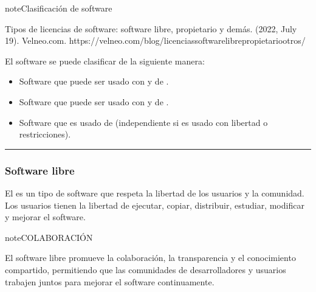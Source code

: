 \documentclass[letterpaper,10pt,spanish]{sphinxmanual}
\begin{document}
\begin{sphinxadmonition}{note}{Clasificación de software}

\sphinxAtStartPar
%
\begin{footnote}[2]\sphinxAtStartFootnote
Tipos de licencias de software: software libre, propietario y demás. (2022, July 19). Velneo.com. https://velneo.com/blog/licencias\sphinxhyphen{}software\sphinxhyphen{}libre\sphinxhyphen{}propietario\sphinxhyphen{}otros/
%
\end{footnote} El software se puede clasificar de la siguiente manera:
\begin{itemize}
\item {} 
\sphinxAtStartPar
{} Software que puede ser usado con  y de .

\item {} 
\sphinxAtStartPar
{} Software que puede ser usado con  y de .

\item {} 
\sphinxAtStartPar
{} Software que es usado de  (independiente si es usado con libertad o restricciones).

\end{itemize}
\end{sphinxadmonition}


\bigskip\hrule\bigskip



\subsubsection{Software libre}
\label{\detokenize{1_guias/10ofimatica/G1012:software-libre}}
\sphinxAtStartPar
\sphinxfootnotemark[2] El  es un tipo de software que respeta la libertad de los usuarios y la comunidad. Los usuarios tienen la libertad de ejecutar, copiar, distribuir, estudiar, modificar y mejorar el software.

\begin{sphinxadmonition}{note}{COLABORACIÓN}

\sphinxAtStartPar
El software libre promueve la colaboración, la transparencia y el conocimiento compartido, permitiendo que las comunidades de desarrolladores y usuarios trabajen juntos para mejorar el software continuamente.
\end{sphinxadmonition}
\end{document}
